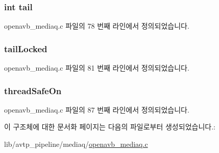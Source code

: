 \subsubsection[{\texorpdfstring{tail}{tail}}]{\setlength{\rightskip}{0pt plus 5cm}int tail}\hypertarget{structmedia__q__info__t_aff39d864a6594bc5f4a5e365282e00fe}{}\label{structmedia__q__info__t_aff39d864a6594bc5f4a5e365282e00fe}


openavb\+\_\+mediaq.\+c 파일의 78 번째 라인에서 정의되었습니다.

\subsubsection[{\texorpdfstring{tail\+Locked}{tailLocked}}]{ tail\+Locked}\hypertarget{structmedia__q__info__t_aa27dbfca4e21d38182c8bd9a49341c23}{}\label{structmedia__q__info__t_aa27dbfca4e21d38182c8bd9a49341c23}


openavb\+\_\+mediaq.\+c 파일의 81 번째 라인에서 정의되었습니다.

\subsubsection[{\texorpdfstring{thread\+Safe\+On}{threadSafeOn}}]{ thread\+Safe\+On}\hypertarget{structmedia__q__info__t_a5b255bb73dcb58b3c4224637b58f42a4}{}\label{structmedia__q__info__t_a5b255bb73dcb58b3c4224637b58f42a4}


openavb\+\_\+mediaq.\+c 파일의 87 번째 라인에서 정의되었습니다.



이 구조체에 대한 문서화 페이지는 다음의 파일로부터 생성되었습니다.\+:\begin{DoxyCompactItemize}
\item 
lib/avtp\+\_\+pipeline/mediaq/\hyperlink{openavb__mediaq_8c}{openavb\+\_\+mediaq.\+c}\end{DoxyCompactItemize}
